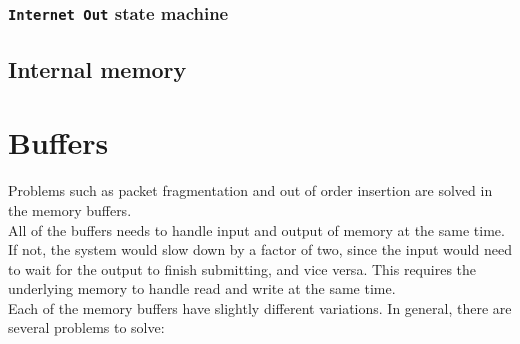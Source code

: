 \subsubsection{\texttt{Internet Out} state machine}


\subsection{Internal memory}


\section{Buffers}
Problems such as packet fragmentation and out of order insertion are solved in
the memory buffers.\\
All of the buffers needs to handle input and output of
memory at the same time. If not, the system would slow down by a factor of two,
since the input would need to wait for the output to finish submitting, and
vice versa. This requires the underlying memory to handle read and write at the
same time. \\
Each of the memory buffers have slightly different variations. In general, there
are several problems to solve:

